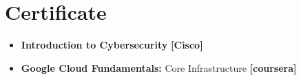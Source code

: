 \documentclass[11pt,a4paper]{moderncv}
\begin{document}
\section{Certificate}
\begin{itemize}
	\item \textbf{Introduction to Cybersecurity}  \textbf{[Cisco]}
	\item \textbf{Google Cloud Fundamentals: } Core Infrastructure \textbf{[coursera]}

\end{itemize}
%
%	
%	
%	
%	
\end{document}
